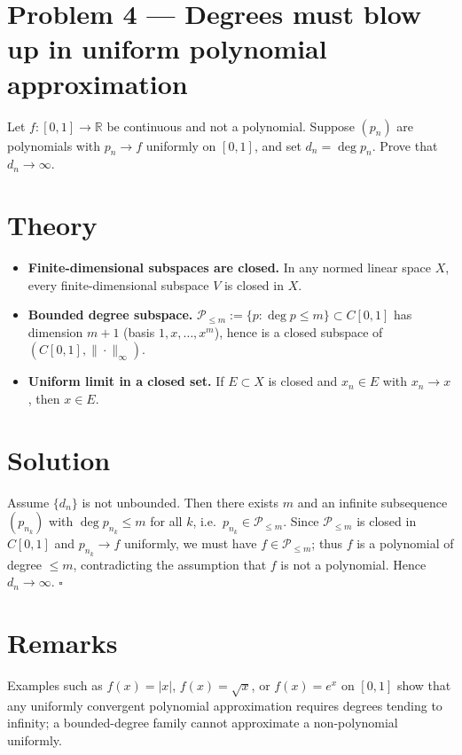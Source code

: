 \documentclass[12pt,a4paper]{article}
\newcommand{\qed}{\hfill$\square$}
\theoremstyle{plain}
\theoremstyle{definition}
\theoremstyle{remark}
\theoremstyle{remark}
\begin{document}
\section*{Problem 4 — Degrees must blow up in uniform polynomial approximation}

Let $f:[0,1]\to\mathbb{R}$ be continuous and not a polynomial. Suppose $(p_n)$ are polynomials
with $p_n\to f$ uniformly on $[0,1]$, and set $d_n=\deg p_n$. Prove that $d_n\to\infty$.

\bigskip

\section*{Theory}

\begin{itemize}\setlength{\itemsep}{0.6em}
	\item \textbf{Finite-dimensional subspaces are closed.}
	In any normed linear space $X$, every finite-dimensional subspace $V$ is closed in $X$.
	\item \textbf{Bounded degree subspace.}
	$\mathcal P_{\le m}:=\{p:\deg p\le m\}\subset C[0,1]$ has dimension $m+1$
	(basis $1,x,\dots,x^m$), hence is a closed subspace of $(C[0,1],\|\cdot\|_\infty)$.
	\item \textbf{Uniform limit in a closed set.}
	If $E\subset X$ is closed and $x_n\in E$ with $x_n\to x$, then $x\in E$.
\end{itemize}

\bigskip

\section*{Solution}

Assume $\{d_n\}$ is not unbounded. Then there exists $m$ and an infinite subsequence $(p_{n_k})$
with $\deg p_{n_k}\le m$ for all $k$, i.e.\ $p_{n_k}\in \mathcal P_{\le m}$.
Since $\mathcal P_{\le m}$ is closed in $C[0,1]$ and $p_{n_k}\to f$ uniformly, we must have
$f\in \mathcal P_{\le m}$; thus $f$ is a polynomial of degree $\le m$, contradicting the
assumption that $f$ is not a polynomial. Hence $d_n\to\infty$. \qed

\bigskip

\section*{Remarks}

Examples such as $f(x)=|x|$, $f(x)=\sqrt{x}$, or $f(x)=e^x$ on $[0,1]$ show that any uniformly
convergent polynomial approximation requires degrees tending to infinity; a bounded-degree
family cannot approximate a non-polynomial uniformly.
\end{document}
